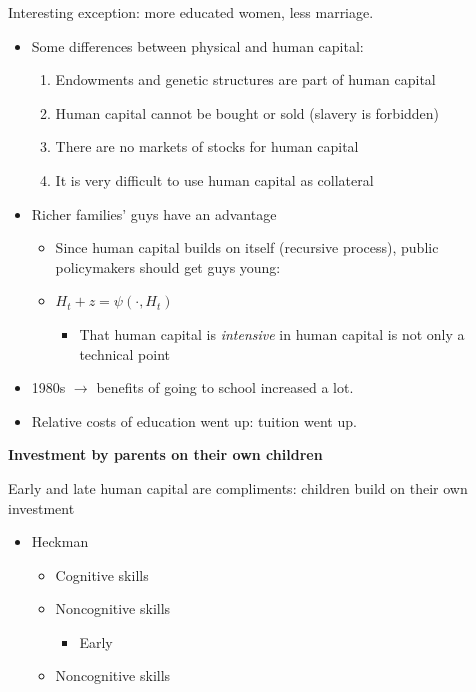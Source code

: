 \documentclass[14pt,notitlepage]{article}
\begin{document}
\noindent Interesting exception: more educated women, less marriage.

\begin{itemize}
\item Some differences between physical and human capital:
	\begin{enumerate}
	\item Endowments and genetic structures are part of human capital
	\item Human capital cannot be bought or sold (slavery is forbidden)
	\item There are no markets of stocks for human capital
	\item It is very difficult to use human capital as collateral
	\end{enumerate}
\end{itemize}

\begin{itemize}
\item Richer families' guys have an advantage
	\begin{itemize}
	\item Since human capital builds on itself (recursive process), public policymakers should get guys young:
	\item $H_t + z = \psi (\cdot, H_t)$
		\begin{itemize}
		\item That human capital is \emph{intensive} in human capital is not only a technical point
		\end{itemize}
	\end{itemize}
\end{itemize}

\begin{itemize}
\item 1980s $\rightarrow$ benefits of going to school increased a lot.
\item Relative costs of education went up: tuition went up.
\end{itemize}

\clearpage

\noindent \textbf{Investment by parents on their own children}

\noindent Early and late human capital are compliments: children build on their own investment

\begin{itemize}
\item Heckman
	\begin{itemize}
	\item Cognitive skills
	\item Noncognitive skills
		\begin{itemize}
		\item Early
		\end{itemize}
	\item Noncognitive skills
	\end{itemize}
\end{itemize}
\end{document}
